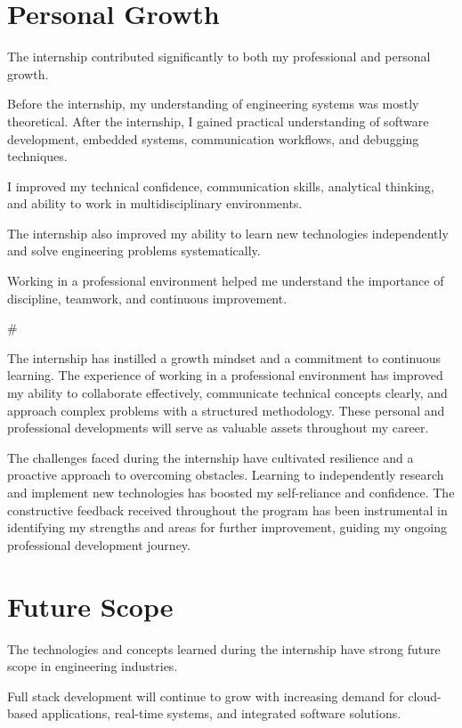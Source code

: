 \documentclass[12pt,a4paper]{report}
\begin{document}
\section{Personal Growth}

The internship contributed significantly to both my professional and personal growth.


Before the internship, my understanding of engineering systems was mostly theoretical. After the internship, I gained practical understanding of software development, embedded systems, communication workflows, and debugging techniques.


I improved my technical confidence, communication skills, analytical thinking, and ability to work in multidisciplinary environments.


The internship also improved my ability to learn new technologies independently and solve engineering problems systematically.


Working in a professional environment helped me understand the importance of discipline, teamwork, and continuous improvement.


\#


The internship has instilled a growth mindset and a commitment to continuous learning. The experience of working in a professional environment has improved my ability to collaborate effectively, communicate technical concepts clearly, and approach complex problems with a structured methodology. These personal and professional developments will serve as valuable assets throughout my career.


The challenges faced during the internship have cultivated resilience and a proactive approach to overcoming obstacles. Learning to independently research and implement new technologies has boosted my self-reliance and confidence. The constructive feedback received throughout the program has been instrumental in identifying my strengths and areas for further improvement, guiding my ongoing professional development journey.


\section{Future Scope}

The technologies and concepts learned during the internship have strong future scope in engineering industries.


Full stack development will continue to grow with increasing demand for cloud-based applications, real-time systems, and integrated software solutions.
\end{document}
